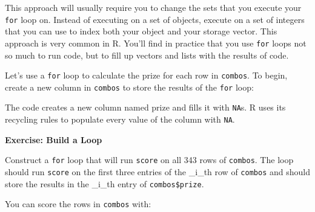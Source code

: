 \documentclass[
  letterpaper,
  DIV=11,
  numbers=noendperiod]{scrbook}
\newenvironment{Shaded}{\begin{snugshade}}{\end{snugshade}}
\newcommand{\ConstantTok}[1]{\textcolor[rgb]{0.56,0.35,0.01}{#1}}
\newcommand{\DecValTok}[1]{\textcolor[rgb]{0.68,0.00,0.00}{#1}}
\newcommand{\DocumentationTok}[1]{\textcolor[rgb]{0.37,0.37,0.37}{\textit{#1}}}
\newcommand{\FunctionTok}[1]{\textcolor[rgb]{0.28,0.35,0.67}{#1}}
\newcommand{\NormalTok}[1]{\textcolor[rgb]{0.00,0.23,0.31}{#1}}
\newcommand{\OtherTok}[1]{\textcolor[rgb]{0.00,0.23,0.31}{#1}}
\newcommand{\SpecialCharTok}[1]{\textcolor[rgb]{0.37,0.37,0.37}{#1}}
\begin{document}
This approach will usually require you to change the sets that you
execute your \texttt{for} loop on. Instead of executing on a set of
objects, execute on a set of integers that you can use to index both
your object and your storage vector. This approach is very common in R.
You'll find in practice that you use \texttt{for} loops not so much to
run code, but to fill up vectors and lists with the results of code.

Let's use a \texttt{for} loop to calculate the prize for each row in
\texttt{combos}. To begin, create a new column in \texttt{combos} to
store the results of the \texttt{for} loop:

\begin{Shaded}
\end{Shaded}

The code creates a new column named prize and fills it with
\texttt{NA}s. R uses its recycling rules to populate every value of the
column with \texttt{NA}.

\begin{tcolorbox}[enhanced jigsaw, left=2mm, breakable, colback=white, colframe=quarto-callout-color-frame, leftrule=.75mm, bottomrule=.15mm, arc=.35mm, opacityback=0, rightrule=.15mm, toprule=.15mm]

\vspace{-3mm}\textbf{Exercise: Build a Loop}\vspace{3mm}

Construct a \texttt{for} loop that will run \texttt{score} on all 343
rows of \texttt{combos}. The loop should run \texttt{score} on the first
three entries of the \_i\_th row of \texttt{combos} and should store the
results in the \_i\_th entry of \texttt{combos\$prize}.

\end{tcolorbox}

You can score the rows in \texttt{combos} with:
\end{document}
